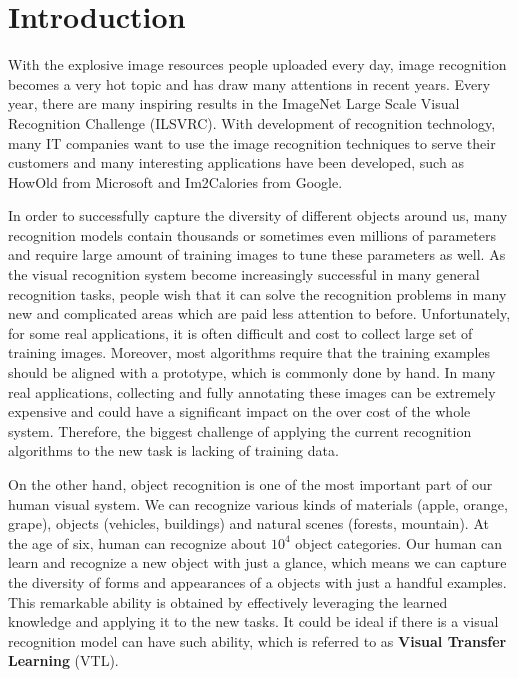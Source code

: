 \chapter{Introduction}\label{sec:intro}
With the explosive image resources people uploaded every day, image recognition becomes a very hot topic and has draw many attentions in recent years. Every year, there are many inspiring results in the ImageNet Large Scale Visual Recognition Challenge (ILSVRC). 
With development of recognition technology, many IT companies want to use the image recognition techniques to serve their customers and many interesting applications have been developed, such as HowOld from Microsoft and Im2Calories from Google.

In order to successfully capture the diversity of different objects around us, many recognition models contain thousands or sometimes even millions of parameters and require large amount of training images to tune these parameters as well.
As the visual recognition system become increasingly successful in many general recognition tasks, people wish that it can solve the recognition problems in many new and complicated areas which are paid less attention to before.  
Unfortunately, for some real applications, it is often difficult and cost to collect large set of training images. Moreover, most algorithms require that the training examples should be aligned with a prototype, which is commonly done by hand. In many real applications, collecting and fully annotating these images can be extremely expensive and could have a significant impact on the over cost of the whole system.
Therefore, the biggest challenge of applying the current recognition algorithms to the new task is lacking of training data.

On the other hand, object recognition is one of the most important part of our human visual system. We can recognize various kinds of materials (apple, orange, grape), objects (vehicles, buildings) and natural scenes (forests, mountain). At the age of six, human can recognize about $10^4$ object categories\cite{biederman1987recognition}. 
Our human can learn and recognize a new object with just a glance, which means we can capture the diversity of forms and appearances of a objects with just a handful examples. This remarkable ability is obtained by effectively leveraging the learned knowledge and applying it to the new tasks. It could be ideal if there is a visual recognition model can have such ability, which is referred to as \textbf{Visual Transfer Learning} (VTL). 

